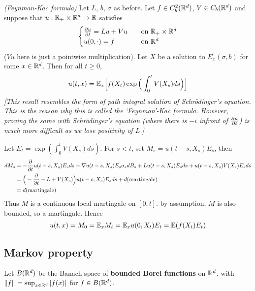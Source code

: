\documentclass[12pt,a4paper]{article}
\newenvironment{proof}
{\begin{changemargin}{0.5cm}{0.5cm} 
	}%
	{\end{changemargin}
}
\newenvironment{p}
{\begin{proof} 
	}%
	{\end{proof}
}
\begin{document}
\thm \emph{(Feynman-Kac formula)} Let $L$, $b$, $\sigma$ as before. Let $f\in C_b^2(\mathbb{R}^d)$, $V\in C_b(\mathbb{R}^d)$ and suppose that $u: \mathbb{R}_+ \times \mathbb{R}^d \rightarrow \mathbb{R}$ satisfies
\begin{align*}
\begin{cases}
\frac{\partial u}{\partial t} = Lu + Vu \quad &\text{on } \mathbb{R}_+ \times \mathbb{R}^d\\
u(0, \cdot) = f\quad &\text{on }\mathbb{R}^d
\end{cases}
\end{align*}
($Vu$ here is just a pointwise multiplication). Let $X$ be a solution to $E_x(\sigma, b)$ for some $x\in \mathbb{R}^d$. Then for all $t\geq 0$,
\begin{align*}
u(t,x) = \mathbb{E}_x \Big[ f(X_t) \exp \Big( \int_0^t V(X_s) ds \Big) \Big]
\end{align*}
\emph{[This result resembles the form of path integral solution of Schr\"odinger's equation. This is the reason why this is called the `Feynman'-Kac formula. However, proving the same with Schr\"odinger's equation (where there is $-i$ infront of $\frac{\partial u}{\partial t}$) is much more difficult as we lose positivity of $L$.]}
\begin{p}
\pf Let $E_t = \exp (\int_0^t V(X_s) ds)$. For $s<t$, set $M_s = u(t-s, X_s) E_s$, then
\begin{align*}
dM_s &= - \frac{\partial }{\partial t} u(t-s, X_s) E_s ds + \nabla u(t-s, X_s) E_s\sigma_s dB_s + L u(t-s, X_s) E_s ds + u(t-s, X_s) V(X_s) E_s ds \\
&= \Big( -\frac{\partial}{\partial t} + L  + V(X_s) \Big)u(t-s, X_s) E_s ds + d(\text{martingale}) \\
&= d(\text{martingale})
\end{align*}
Thus $M$ is a continuous local martingale on $[0,t]$. by assumption, $M$ is also bounded, so a martingale. Hence
\begin{align*}
u(t,x) = M_0 = \mathbb{E}_x M_t = \mathbb{E}_x u(0, X_t) E_t = \mathbb{E} (f(X_t) E_t)
\end{align*}
\eop
\end{p}

\subsection{Markov property}

Let $B(\mathbb{R}^d)$ be the Banach space of \textbf{bounded Borel functions} on $\mathbb{R}^d$, with $\snorms{f}{} = \sup_{x\in \reals^d} |f(x)|$ for $f\in B(\mathbb{R}^d)$.
\s
\end{document}
